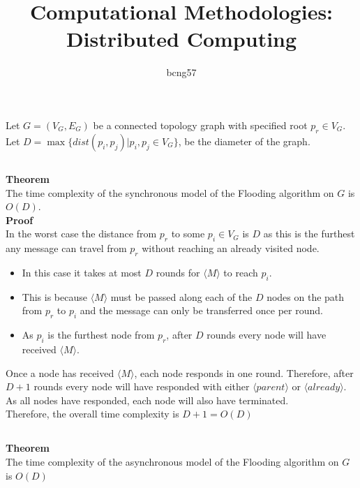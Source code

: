 \documentclass[11pt]{article}
\title{\vspace{-2.5cm}Computational Methodologies: Distributed Computing}
\author{bcng57}
\date{}
\begin{document}
\maketitle

\section{}

Let $G=(V_G, E_G)$ be a connected topology graph with specified root $p_r\in V_G$. Let $D=\max\{dist(p_i,p_j)|p_i,p_j\in V_G\}$, be the diameter of the graph.

\subsection{}

\textbf{Theorem}\\
The time complexity of the synchronous model of the Flooding algorithm on $G$ is $O(D)$.\\

\textbf{Proof}\\
In the worst case the distance from $p_r$ to some $p_i \in V_G$ is $D$ as this is the furthest any message can travel from $p_r$ without reaching an already visited node.
\begin{itemize}
\item In this case it takes at most $D$ rounds for $\langle M \rangle$ to reach $p_i$.
\item This is because $\langle M \rangle$ must be passed along each of the $D$ nodes on the path from $p_r$ to $p_i$ and  the message can only be transferred once per round.
\item As $p_i$ is the furthest node from $p_r$, after $D$ rounds every node will have received $\langle M \rangle$.
\end{itemize}
Once a node has received $\langle M \rangle$, each node responds in one round. Therefore, after $D+1$ rounds every node will have responded with either $\langle parent \rangle$ or $\langle already \rangle$. As all nodes have responded, each node will also have terminated.\\
Therefore, the overall time complexity is $D+1=O(D)$ %

\newpage

\subsection{}

\textbf{Theorem}\\
The time complexity of the asynchronous model of the Flooding algorithm on $G$ is $O(D)$\\
\end{document}
